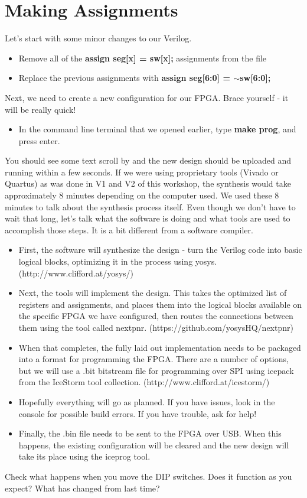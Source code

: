 \documentclass[12pt,a4paper]{article}
\begin{document}
\section{Making Assignments}
Let’s start with some minor changes to our Verilog.
\begin{itemize}
	\item Remove all of the \textbf{assign seg[x] = sw[x];} assignments from the file 
	\item Replace the previous assignments with \textbf{assign seg[6:0] = $\sim$sw[6:0];}
\end{itemize}
\noindent
Next, we need to create a new configuration for our FPGA. Brace yourself - it will be really quick!
\begin{itemize}
	\item In the command line terminal that we opened earlier, type \textbf{make prog}, and press enter. 
\end{itemize}
\noindent
You should see some text scroll by and the new design should be uploaded and running within a few seconds. If we were using proprietary tools (Vivado or Quartus) as was done in V1 and V2 of this workshop, the synthesis would take approximately 8 minutes depending on the computer used. We used these 8 minutes to talk about the synthesis process itself. Even though we don’t have to wait that long, let’s talk what the software is doing and what tools are used to accomplish those steps. It is a bit different from a software compiler.

\begin{itemize}
	\item First, the software will synthesize the design - turn the Verilog code into basic logical blocks, optimizing it in the process using yosys. (http://www.clifford.at/yosys/)
	\item Next, the tools will implement the design. This takes the optimized list of registers and assignments, and places them into the logical blocks available on the specific FPGA we have configured, then routes the connections between them using the tool called nextpnr. (https://github.com/yosysHQ/nextpnr)
	\item When that completes, the fully laid out 	implementation needs to be packaged into a 	format for programming the FPGA. There are a 	number of options, but we will use a .bit bitstream file for programming over SPI using icepack from the IceStorm tool collection.
	(http://www.clifford.at/icestorm/)
	\item Hopefully everything will go as planned. If you have issues, look in the console for possible build errors. If you have trouble, ask for help!
	\item Finally, the .bin file needs to be sent to the FPGA over USB. When this happens, the existing configuration will be cleared and the new design will take its place using the iceprog tool.
\end{itemize}
\noindent
Check what happens when you move the DIP switches. Does it function as you expect? What has changed from last time?
\end{document}
